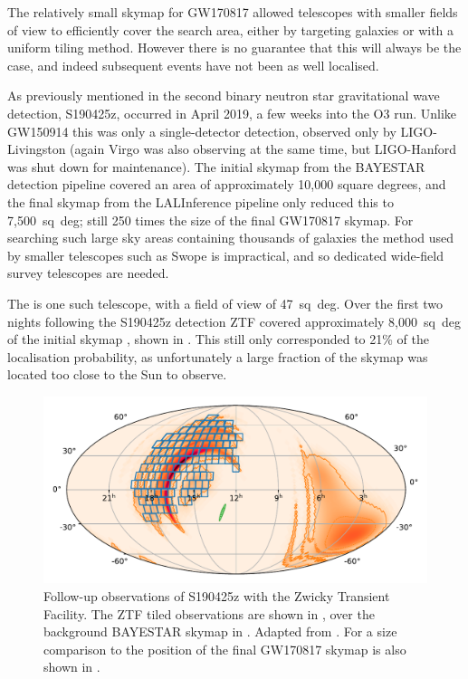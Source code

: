 \begin{colsection}
\begin{colsection}
The relatively small skymap for GW170817 allowed telescopes with smaller fields of view to efficiently cover the search area, either by targeting galaxies or with a uniform tiling method. However there is no guarantee that this will always be the case, and indeed subsequent events have not been as well localised.

As previously mentioned in  the second binary neutron star gravitational wave detection, S190425z, occurred in April 2019, a few weeks into the O3 run. Unlike GW150914 this was only a single-detector detection, observed only by LIGO-Livingston (again Virgo was also observing at the same time, but LIGO-Hanford was shut down for maintenance). The initial skymap from the BAYESTAR detection pipeline covered an area of approximately 10,000 square degrees, and the final skymap from the LALInference pipeline only reduced this to 7,500~sq~deg; still 250 times the size of the final GW170817 skymap. For searching such large sky areas containing thousands of galaxies the method used by smaller telescopes such as Swope is impractical, and so dedicated wide-field survey telescopes are needed.

The  is one such telescope, with a field of view of 47~sq~deg. Over the first two nights following the S190425z detection ZTF covered approximately 8,000~sq~deg of the initial skymap \citep{GW190425_ZTF}, shown in . This still only corresponded to 21\% of the localisation probability, as unfortunately a large fraction of the skymap was located too close to the Sun to observe.

\newpage

\begin{figure}[t]
    \begin{center}
        \includegraphics[width=0.9\linewidth]{images/190425.pdf}
    \end{center}
    \caption[Follow-up observations of S190425z with ZTF]{
        Follow-up observations of S190425z with the Zwicky Transient Facility. The ZTF tiled observations are shown in , over the background BAYESTAR skymap in . Adapted from \citet{GW190425_ZTF}. For a size comparison to  the position of the final GW170817 skymap is also shown in .
        }\label{fig:ztf}
\end{figure}


\end{colsection}
\end{colsection}
